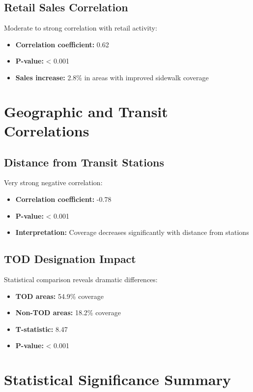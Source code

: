 \documentclass[11pt,letterpaper]{report}
\begin{document}
\subsection{Retail Sales Correlation}
Moderate to strong correlation with retail activity:
\begin{itemize}
    \item \textbf{Correlation coefficient:} 0.62
    \item \textbf{P-value:} < 0.001
    \item \textbf{Sales increase:} 2.8\% in areas with improved sidewalk coverage
\end{itemize}

\section{Geographic and Transit Correlations}

\subsection{Distance from Transit Stations}
Very strong negative correlation:
\begin{itemize}
    \item \textbf{Correlation coefficient:} -0.78
    \item \textbf{P-value:} < 0.001
    \item \textbf{Interpretation:} Coverage decreases significantly with distance from stations
\end{itemize}

\subsection{TOD Designation Impact}
Statistical comparison reveals dramatic differences:
\begin{itemize}
    \item \textbf{TOD areas:} 54.9\% coverage
    \item \textbf{Non-TOD areas:} 18.2\% coverage
    \item \textbf{T-statistic:} 8.47
    \item \textbf{P-value:} < 0.001
\end{itemize}

\section{Statistical Significance Summary}
\end{document}
